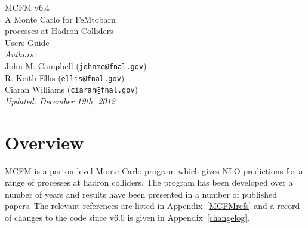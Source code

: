 \documentclass[12pt]{article}
\begin{document}
\def\GeV{\mbox{GeV}}
\def\cteqten{\mbox{1007.2241 [hep-ph]}}
\def\cteqsixsixm{\mbox{0802.0007 [hep-ph]}}
\def\cteqsixonem{\mbox{hep-ph/0303013}}
\def\cteqsix{\mbox{hep-ph/0201195}}
\def\cteqfive{\mbox{hep-ph/9903282}}
\def\cteqfour{\mbox{hep-ph/9606399}}
\def\cteqthree{\mbox{MSU-HEP/41024}}
\def\mrstff{\mbox{hep-ph/0603143}}
\def\mrstohtwo{\mbox{hep-ph/0211080}}
\def\mrstohtwofirst{\mbox{hep-ph/0201127}}
\def\mrstohone{\mbox{hep-ph/0110215}}
\def\mrsninenine{\mbox{hep-ph/9907231}}
\def\mrsnineeight{\mbox{hep-ph/9803445}}
\def\mrsninesix{\mbox{PLB387 (1996) 419}}
\def\mrsninefive{\mbox{PLB354 (1995) 155}}
\def\hmrs{\mbox{Durham DTP-90-04}}
\def\mstwoheight{\mbox{0901.0002 [hep-ph]}}
\def\pow{{\lower.12ex\hbox{\texttt{\char`\^}}}}

\thispagestyle{empty}
\vspace*{3cm}
\begin{center}
{\Huge MCFM v6.4} \\
\vspace*{0.5cm}
\Large{A Monte Carlo for FeMtobarn} \\
\Large{processes at Hadron Colliders} \\
\vspace*{2cm}
{\huge Users Guide} \\
\vspace*{4cm}
{\it Authors:} \\
\vspace*{0.2cm}
John M. Campbell ({\tt johnmc@fnal.gov}) \\
R. Keith Ellis ({\tt ellis@fnal.gov}) \\
Ciaran Williams ({\tt ciaran@fnal.gov}) \\
\vspace*{2cm}
{\it \small Updated: December 19th, 2012}
\end{center}

\newpage

\tableofcontents

\section{Overview}

MCFM is a parton-level Monte Carlo program which gives NLO predictions
for a range of processes at hadron colliders. The program has been
developed over a number of years and results have been presented in
a number of published papers. The relevant references are listed
in Appendix~\ref{MCFMrefs} and a record of changes to the code
since v6.0 is given in Appendix~\ref{changelog}.
\end{document}
